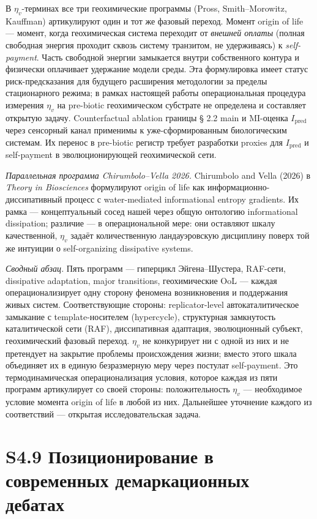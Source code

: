 \documentclass[pdflatex,sn-mathphys-ay]{sn-jnl}
\begin{document}
В \(\eta_v\)-терминах все три геохимические программы (Pross, Smith--Morowitz, Kauffman) артикулируют один и тот же фазовый переход. Момент origin of life --- момент, когда геохимическая система переходит от \emph{внешней оплаты} (полная свободная энергия проходит сквозь систему транзитом, не удерживаясь) к \emph{self-payment}. Часть свободной энергии замыкается внутри собственного контура и физически оплачивает удержание модели среды. Эта формулировка имеет статус риск-предсказания для будущего расширения методологии за пределы стационарного режима; в рамках настоящей работы операциональная процедура измерения \(\eta_v\) на pre-biotic геохимическом субстрате не определена и составляет открытую задачу. Counterfactual ablation границы § 2.2 main и MI-оценка \(I_{\text{pred}}\) через сенсорный канал применимы к уже-сформированным биологическим системам. Их перенос в pre-biotic регистр требует разработки proxies для \(I_{\text{pred}}\) и self-payment в эволюционирующей геохимической сети.

\emph{Параллельная программа Chirumbolo--Vella 2026.} Chirumbolo and Vella (2026) в \emph{Theory in Biosciences} формулируют origin of life как информационно-диссипативный процесс с water-mediated informational entropy gradients. Их рамка --- концептуальный сосед нашей через общую онтологию informational dissipation; различие --- в операциональной мере: они оставляют шкалу качественной, \(\eta_v\) задаёт количественную ландауэровскую дисциплину поверх той же интуиции о self-organizing dissipative systems.

\emph{Сводный абзац.} Пять программ --- гиперцикл Эйгена--Шустера, RAF-сети, dissipative adaptation, major transitions, геохимические OoL --- каждая операционализирует одну сторону феномена возникновения и поддержания живых систем. Соответствующие стороны: replicator-level автокаталитическое замыкание с template-носителем (hypercycle), структурная замкнутость каталитической сети (RAF), диссипативная адаптация, эволюционный субъект, геохимический фазовый переход. \(\eta_v\) не конкурирует ни с одной из них и не претендует на закрытие проблемы происхождения жизни; вместо этого шкала объединяет их в единую безразмерную меру через постулат self-payment. Это термодинамическая операционализация условия, которое каждая из пяти программ артикулирует со своей стороны: положительность \(\eta_v\) --- необходимое условие момента origin of life в любой из них. Дальнейшее уточнение каждого из соответствий --- открытая исследовательская задача.

\section*{S4.9 Позиционирование в современных демаркационных дебатах}\label{s4.9-ux43fux43eux437ux438ux446ux438ux43eux43dux438ux440ux43eux432ux430ux43dux438ux435-ux432-ux441ux43eux432ux440ux435ux43cux435ux43dux43dux44bux445-ux434ux435ux43cux430ux440ux43aux430ux446ux438ux43eux43dux43dux44bux445-ux434ux435ux431ux430ux442ux430ux445}
\end{document}
